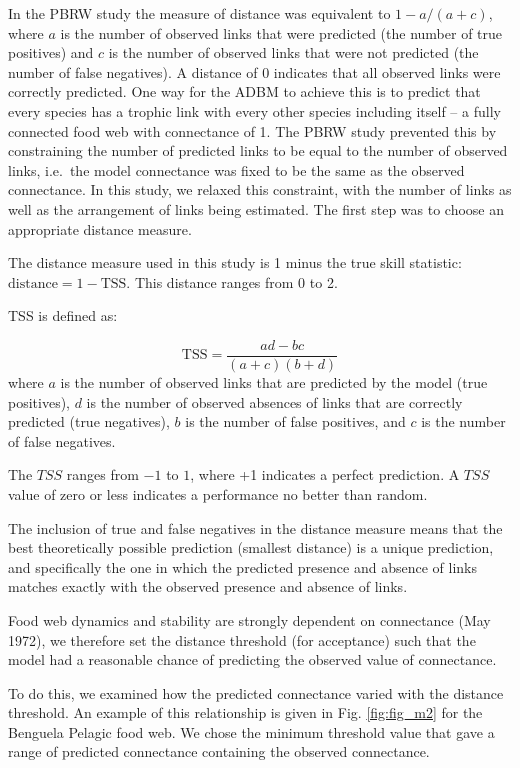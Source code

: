 \documentclass{article}
\begin{document}
In the PBRW study the measure of distance was equivalent to
\(1 - a / (a + c)\), where \(a\) is the number of observed links that
were predicted (the number of true positives) and \(c\) is the number of
observed links that were not predicted (the number of false negatives).
A distance of 0 indicates that all observed links were correctly
predicted. One way for the ADBM to achieve this is to predict that every
species has a trophic link with every other species including itself --
a fully connected food web with connectance of 1. The PBRW study
prevented this by constraining the number of predicted links to be equal
to the number of observed links, i.e.~the model connectance was fixed to
be the same as the observed connectance. In this study, we relaxed this
constraint, with the number of links as well as the arrangement of links
being estimated. The first step was to choose an appropriate distance
measure.

The distance measure used in this study is 1 minus the true skill
statistic: \(\text{distance} = 1 - \text{TSS}\). This distance ranges
from 0 to 2.

TSS is defined as:

\[ \text{TSS} = \frac{ad-bc}{(a+c)(b+d)} \] where \(a\) is the number of
observed links that are predicted by the model (true positives), \(d\)
is the number of observed absences of links that are correctly predicted
(true negatives), \(b\) is the number of false positives, and \(c\) is
the number of false negatives.

The \(TSS\) ranges from \(-1\) to \(1\), where +1 indicates a perfect
prediction. A \(TSS\) value of zero or less indicates a performance no
better than random.

The inclusion of true and false negatives in the distance measure means
that the best theoretically possible prediction (smallest distance) is a
unique prediction, and specifically the one in which the predicted
presence and absence of links matches exactly with the observed presence
and absence of links.

Food web dynamics and stability are strongly dependent on connectance
(May 1972), we therefore set the distance threshold (for acceptance)
such that the model had a reasonable chance of predicting the observed
value of connectance.

To do this, we examined how the predicted connectance varied with the
distance threshold. An example of this relationship is given in Fig.
\ref{fig:fig_m2} for the Benguela Pelagic food web. We chose the minimum
threshold value that gave a range of predicted connectance containing
the observed connectance.
\end{document}

